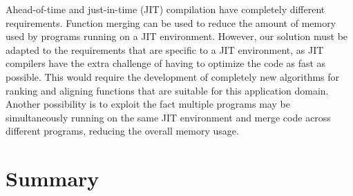 Ahead-of-time and just-in-time (JIT) compilation have completely different requirements.
Function merging can be used to reduce the amount of memory used by programs running on a JIT environment.
However, our solution must be adapted to the requirements that are specific to a JIT environment, as JIT compilers have the extra challenge of having to optimize the code as fast as possible.
This would require the development of completely new algorithms for ranking and aligning functions that are suitable for this application domain.
Another possibility is to exploit the fact multiple programs may be simultaneously running on the same JIT environment and merge code across different programs, reducing the overall memory usage.

\section{Summary} \label{sec:conclusion:summary}